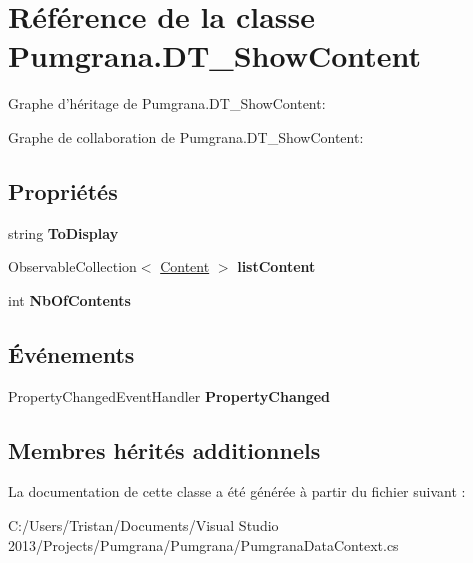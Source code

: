 \hypertarget{class_pumgrana_1_1_d_t___show_content}{\section{Référence de la classe Pumgrana.\+D\+T\+\_\+\+Show\+Content}
\label{class_pumgrana_1_1_d_t___show_content}
}


Graphe d'héritage de Pumgrana.\+D\+T\+\_\+\+Show\+Content\+:


Graphe de collaboration de Pumgrana.\+D\+T\+\_\+\+Show\+Content\+:
\subsection*{Propriétés}
\begin{DoxyCompactItemize}
\item 
\hypertarget{class_pumgrana_1_1_d_t___show_content_aeae98f8d257ccbe1e71d020b65c97a1e}{string {\bfseries To\+Display}}\label{class_pumgrana_1_1_d_t___show_content_aeae98f8d257ccbe1e71d020b65c97a1e}

\item 
\hypertarget{class_pumgrana_1_1_d_t___show_content_a13a7e7cb6593f88e954d994e69e416ab}{Observable\+Collection$<$ \hyperlink{class_pumgrana_1_1_content}{Content} $>$ {\bfseries list\+Content}}\label{class_pumgrana_1_1_d_t___show_content_a13a7e7cb6593f88e954d994e69e416ab}

\item 
\hypertarget{class_pumgrana_1_1_d_t___show_content_ab900b0c0497845661b701c4496984969}{int {\bfseries Nb\+Of\+Contents}}\label{class_pumgrana_1_1_d_t___show_content_ab900b0c0497845661b701c4496984969}

\end{DoxyCompactItemize}
\subsection*{Événements}
\begin{DoxyCompactItemize}
\item 
\hypertarget{class_pumgrana_1_1_d_t___show_content_a0bb69ae35944a5bc0bae11d9961ca139}{Property\+Changed\+Event\+Handler {\bfseries Property\+Changed}}\label{class_pumgrana_1_1_d_t___show_content_a0bb69ae35944a5bc0bae11d9961ca139}

\end{DoxyCompactItemize}
\subsection*{Membres hérités additionnels}


La documentation de cette classe a été générée à partir du fichier suivant \+:\begin{DoxyCompactItemize}
\item 
C\+:/\+Users/\+Tristan/\+Documents/\+Visual Studio 2013/\+Projects/\+Pumgrana/\+Pumgrana/Pumgrana\+Data\+Context.\+cs\end{DoxyCompactItemize}
